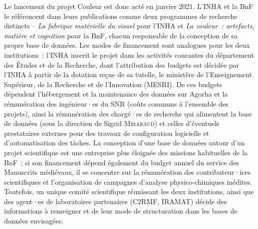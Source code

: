 \documentclass[a4paper,12pt, twoside]{book}
\begin{document}
Le lancement du projet Couleur est donc acté en janvier 2021. L’INHA et la BnF le référencent dans leurs publications comme deux programmes de recherche distincts – \textit{La fabrique matérielle du visuel} pour l’INHA et \textit{La couleur~: artefacts, matière et cognition} pour la BnF, chacun responsable de la conception de sa propre base de données. Les modes de financement sont analogues pour les deux institutions~: l’INHA inscrit le projet dans les activités courantes du département des Études et de la Recherche, dont l’attribution des budgets est décidée par l’INHA à partir de la dotation reçue de sa tutelle, le ministère de l’Enseignement Supérieur, de la Recherche et de l’Innovation (MESRI). De ces budgets dépendent l’hébergement et la maintenance des données sur Agorha et la rémunération des ingénieur·es du SNR (coûts communs à l’ensemble des projets), ainsi la rémunération des chargé·es de recherche qui alimentent la base de données (sous la direction de Sigrid \textsc{Mirabaud}) et celles d’éventuels prestataires externes pour des travaux de configuration logicielle et d’automatisation des tâches. La conception d’une base de données autour d’un projet scientifique est une entreprise plus éloignée des missions habituelles de la BnF~; si son financement dépend également du budget annuel du service des Manuscrits médiévaux, il se concentre sur la rémunération des contributeur·ices scientifiques et l'organisation de campagnes d'analyse physico-chimiques inédites.  Toutefois, un unique comité scientifique réunissant les deux institutions, ainsi que des agent·es de laboratoires partenaires (C2RMF, IRAMAT) décide des informations à renseigner et de leur mode de structuration dans les bases de données envisagées.
\end{document}
